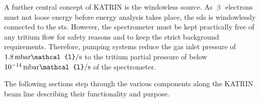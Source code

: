 A further central concept of KATRIN is the windowless source. As $\upbeta$ electrons must not loose energy before energy analysis takes place, the \gls{sds} is windowlessly connected to the \gls{sts}. However, the spectrometer must be kept practically free of any tritium flow for safety reasons and to keep the strict background requirements. Therefore, pumping systems reduce the gas inlet pressure of $1.8\text{\,mbar}\mathcal{l}/\text{s}$ to the tritium partial pressure of below $10^{-14}\text{\,mbar}\mathcal{l}/\text{s}$ of the spectrometer.

The following sections step through the various components along the KATRIN beam line describing their functionality and purpose.
